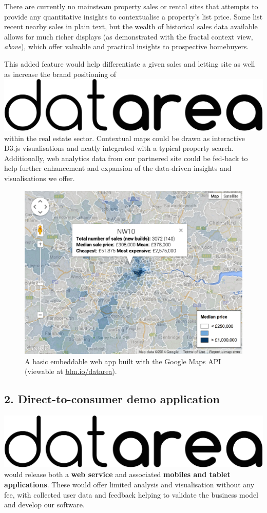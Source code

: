 \documentclass[
10pt, %
a4paper, %
oneside, %
headinclude,footinclude, %
BCOR5mm, %
]{scrartcl}
\newcommand*{\logo}{\includegraphics[scale=.04]{Figures/logotext.png}}
\begin{document}
There are currently no mainsteam property sales or rental sites that
attempts to provide any quantitative insights to contextualise a
property's list price. Some list recent nearby sales in plain text,
but the wealth of historical sales data available allows for much
richer displays (as demonstrated with the fractal context view,
\emph{above}), which offer valuable and practical insights to
prospective homebuyers.

This added feature would help differentiate a given sales and letting
site as well as increase the brand positioning of \logo\hspace{.1em}
within the real estate sector. Contextual maps could be drawn as
interactive D3.js visualisations and neatly integrated with a typical
property search. Additionally, web analytics data from our partnered
site could be fed-back to help further enhancement and expansion of
the data-driven insights and visualisations we offer.

\begin{figure}[h]
\vspace{1.5em}
\centering
\includegraphics[width=.85\textwidth]{Figures/gmapScreenshot.png}
\vspace{.5em}
\caption{ A basic embeddable web app built with the Google Maps API
  (viewable at \href{http://blm.io/datarea}{blm.io/datarea}). }
\end{figure}

\subsection*{2. Direct-to-consumer demo application}

\logo \hspace{.1em} would release both a {\bf web service} and associated
{\bf mobiles and tablet applications}. These would offer limited analysis and
visualisation without any fee, with collected user data and feedback helping to
validate the business model and develop our software.
\end{document}
